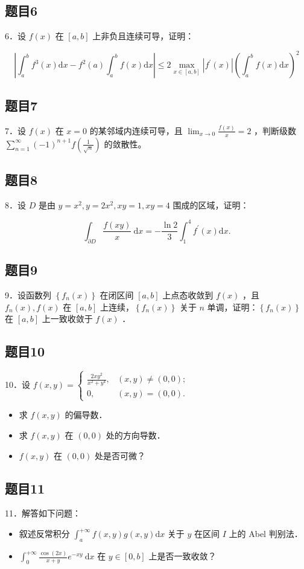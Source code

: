 \documentclass{article}
\begin{document}
\subsection{题目6}
6．设 \(f(x)\) 在 \([a, b]\) 上非负且连续可导，证明：

\[
\left|\int_{a}^{b} f^{3}(x) \mathrm{d} x-f^{2}(a) \int_{a}^{b} f(x) \mathrm{d} x\right| \leq 2 \max _{x \in[a, b]}\left|f^{\prime}(x)\right|\left(\int_{a}^{b} f(x) \mathrm{d} x\right)^{2}
\]

\subsection{题目7}
7．设 \(f(x)\) 在 \(x=0\) 的某邻域内连续可导，且 \(\lim _{x \rightarrow 0} \frac{f(x)}{x}=2\) ，判断级数 \(\sum_{n=1}^{\infty}(-1)^{n+1} f\left(\frac{1}{\sqrt{n}}\right)\) 的敛散性。

\subsection{题目8}
8．设 \(D\) 是由 \(y=x^{2}, y=2 x^{2}, x y=1, x y=4\) 围成的区域，证明：

\[
\int_{\partial D} \frac{f(x y)}{x} \mathrm{~d} x=-\frac{\ln 2}{3} \int_{1}^{4} f^{\prime}(x) \mathrm{d} x .
\]

\subsection{题目9}
9．设函数列 \(\left\{f_{n}(x)\right\}\) 在闭区间 \([a, b]\) 上点态收敛到 \(f(x)\) ，且 \(f_{n}(x), f(x)\) 在 \([a, b]\) 上连续，\(\left\{f_{n}(x)\right\}\) 关于 \(n\) 单调，证明：\(\left\{f_{n}(x)\right\}\) 在 \([a, b]\) 上一致收敛于 \(f(x)\) ．

\subsection{题目10}
10．设 \(f(x, y)= \begin{cases}\frac{2 x y^{2}}{x^{2}+y^{4}}, & (x, y) \neq(0,0) ; \\ 0, & (x, y)=(0,0) .\end{cases}\)

\begin{itemize}
  \item[（1）] 求 \(f(x, y)\) 的偏导数．
  \item[（2）] 求 \(f(x, y)\) 在 \((0,0)\) 处的方向导数．
  \item[（3）] \(f(x, y)\) 在 \((0,0)\) 处是否可微？
\end{itemize}

\subsection{题目11}
11．解答如下问题：

\begin{itemize}
  \item[（1）] 叙述反常积分 \(\int_{a}^{+\infty} f(x, y) g(x, y) \mathrm{d} x\) 关于 \(y\) 在区间 \(I\) 上的 Abel 判别法．
  \item[（2）] \(\int_{0}^{+\infty} \frac{\cos (2 x)}{x+y} e^{-x y} \mathrm{~d} x\) 在 \(y \in[0, b]\) 上是否一致收敛？
\end{itemize}
\end{document}
